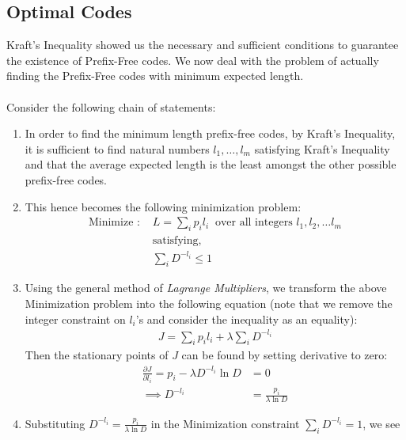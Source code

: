 \documentclass{article}
\theoremstyle{definition}
\theoremstyle{remark}
\theoremstyle{definition}
\theoremstyle{definition}
\theoremstyle{definition}
\newcommand{\pder}[2]{\frac{\partial #1}{\partial #2}}
\begin{document}
\subsection{Optimal Codes}
Kraft's Inequality showed us the necessary and sufficient conditions to guarantee the existence of Prefix-Free codes. We now deal with the problem of actually finding the Prefix-Free codes with minimum expected length. \\\\
Consider the following chain of statements:
\begin{enumerate}
	\item {In order to find the minimum length prefix-free codes, by Kraft's Inequality, it is sufficient to find natural numbers $ l_1,\dots,l_m $ satisfying Kraft's Inequality and that the average expected length is the least amongst the other possible prefix-free codes.}
	\item {This hence becomes the following minimization problem:
\begin{equation}
	\begin{split}
		\text{Minimize : }& L = \sum_{i} p_i l_i\;\;\text{over all integers }l_1,l_2,\dots l_m\\
		&\text{satisfying,}\\
		&\sum_{i}D^{-l_i} \le 1
	\end{split}
\end{equation}	
}
\item {Using the general method of \emph{Lagrange Multipliers}, we transform the above Minimization problem into the following equation (note that we remove the integer constraint on $ l_i $'s and consider the inequality as an equality):
\begin{equation*}
	\begin{split}
		J = \sum_{i} p_il_i + \lambda\sum_{i}D^{-l_i}
	\end{split}
\end{equation*}
Then the stationary points of $ J $ can be found by setting derivative to zero:
\begin{equation*}
	\begin{split}
		\pder{J}{l_i} = p_i  -\lambda  D^{-l_i} \ln D &= 0\\
		\implies D^{-l_i} &= \frac{p_i}{\lambda  \ln D}
	\end{split}
\end{equation*}
}
\item {Substituting $  D^{-l_i} = \frac{p_i}{\lambda  \ln D} $ in the Minimization constraint $ \sum_{i} D^{-l_i} = 1$, we see
}
\end{enumerate}
\end{document}
